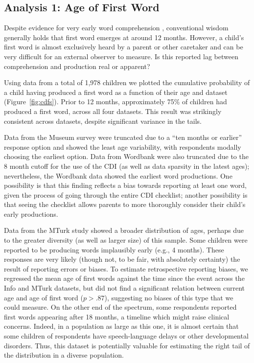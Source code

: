 \documentclass[10pt,letterpaper]{article}
\begin{document}
\subsection{Analysis 1: Age of First Word} 

Despite evidence for very early word comprehension \cite{tincoff1999,tincoff2012,bergelson2012}, conventional wisdom generally holds that first word emerges at around 12 months. However, a child's first word is almost exclusively heard by a parent or other caretaker and can be very difficult for an external observer to measure. Is this reported lag between comprehension and production real or apparent? 

Using data from a total of 1,978 children we plotted the cumulative probability of a child having produced a first word as a function of their age and dataset (Figure~\ref{fig:cdfs}). Prior to 12 months, approximately 75\% of children had produced a first word, across all four datasets. This result was strikingly consistent across datasets, despite significant variance in the tails. 

Data from the Museum survey were truncated due to a ``ten months or earlier'' response option and showed the least age variability, with respondents modally choosing the earliest option. Data from Wordbank were also truncated due to the 8 month cutoff for the use of the CDI (as well as data sparsity in the latest ages); nevertheless, the Wordbank data showed the earliest word productions. One possibility is that this finding reflects a bias towards reporting at least one word, given the process of going through the entire CDI checklist; another possibility is that seeing the checklist allows parents to more thoroughly consider their child's early productions. 

Data from the MTurk study showed a broader distribution of ages, perhaps due to the greater diversity (as well as larger size) of this sample. Some children were reported to be producing words implausibly early (e.g., 4 months). These responses are very likely (though not, to be fair, with absolutely certainty) the result of reporting errors or biases. To estimate retrospective reporting biases, we regressed the mean age of first words against the time since the event across the Info and MTurk datasets, but did not find a significant relation between current age and age of first word ($p > .87$), suggesting no biases of this type that we could measure. On the other end of the spectrum, some respondents reported first words appearing after 18 months, a timeline which might raise clinical concerns. Indeed, in a population as large as this one, it is almost certain that some children of respondents have speech-language delays or other developmental disorders. Thus, this dataset is potentially valuable for estimating the right tail of the distribution in a diverse population. 
\end{document}
